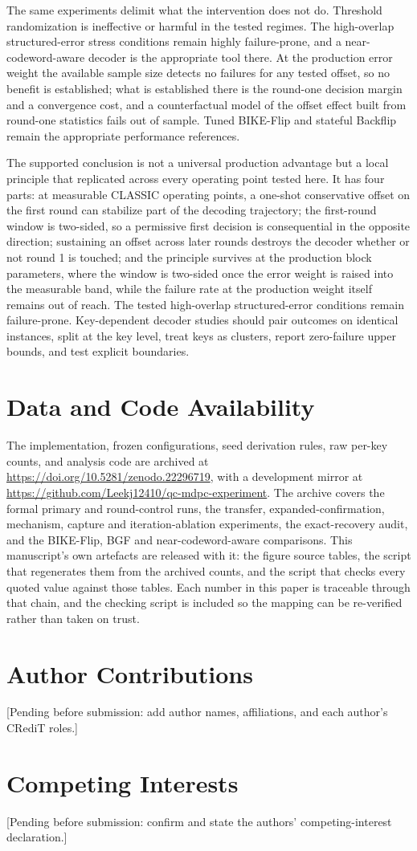 \documentclass[lettersize,journal]{IEEEtran}
\begin{document}
The same experiments delimit what the intervention does not do. Threshold randomization is ineffective or harmful in the tested regimes. The high-overlap structured-error stress conditions remain highly failure-prone, and a near-codeword-aware decoder is the appropriate tool there. At the production error weight the available sample size detects no failures for any tested offset, so no benefit is established; what is established there is the round-one decision margin and a convergence cost, and a counterfactual model of the offset effect built from round-one statistics fails out of sample. Tuned BIKE-Flip and stateful Backflip remain the appropriate performance references.

The supported conclusion is not a universal production advantage but a local principle that replicated across every operating point tested here. It has four parts: at measurable CLASSIC operating points, a one-shot conservative offset on the first round can stabilize part of the decoding trajectory; the first-round window is two-sided, so a permissive first decision is consequential in the opposite direction; sustaining an offset across later rounds destroys the decoder whether or not round 1 is touched; and the principle survives at the production block parameters, where the window is two-sided once the error weight is raised into the measurable band, while the failure rate at the production weight itself remains out of reach. The tested high-overlap structured-error conditions remain failure-prone. Key-dependent decoder studies should pair outcomes on identical instances, split at the key level, treat keys as clusters, report zero-failure upper bounds, and test explicit boundaries.

\section*{Data and Code Availability}
The implementation, frozen configurations, seed derivation rules, raw per-key counts, and analysis code are archived at \url{https://doi.org/10.5281/zenodo.22296719}, with a development mirror at \url{https://github.com/Leekj12410/qc-mdpc-experiment}. The archive covers the formal primary and round-control runs, the transfer, expanded-confirmation, mechanism, capture and iteration-ablation experiments, the exact-recovery audit, and the BIKE-Flip, BGF and near-codeword-aware comparisons. This manuscript's own artefacts are released with it: the figure source tables, the script that regenerates them from the archived counts, and the script that checks every quoted value against those tables. Each number in this paper is traceable through that chain, and the checking script is included so the mapping can be re-verified rather than taken on trust.

\section*{Author Contributions}
[Pending before submission: add author names, affiliations, and each author's CRediT roles.]

\section*{Competing Interests}
[Pending before submission: confirm and state the authors' competing-interest declaration.]



\end{document}
